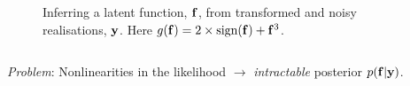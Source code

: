 \documentclass{beamer}
\begin{document}
\begin{frame}
\begin{columns}
\begin{column}{0.5\linewidth}
\begin{figure}
    \caption{Inferring a latent function, $\mathbf{f}$, from transformed and noisy
        realisations, $\mathbf{y}$. Here $g\!\left({{\mathbf{f}}}\right) =
        2\times\text{sign}\!\left({\mathbf{f}}\right) + \mathbf{f}^3$.}


\end{figure}

\end{column}
\end{columns}

\vspace{2mm}

\emph{Problem}: Nonlinearities in the likelihood $\rightarrow$ 
\emph{intractable} posterior $p\!\left({\mathbf{f}}\middle\vert{\ensuremath{\mathbf{y}}}\right)$.
\vspace{3mm}


\end{frame}


\end{document}
